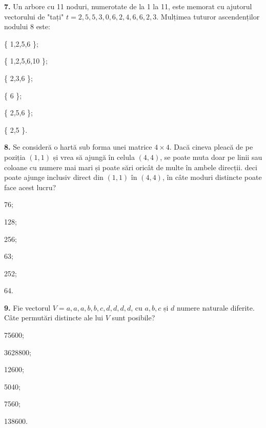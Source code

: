 \documentclass[11pt, a4paper]{article}
\begin{document}
\vspace{0.5cm}

\textbf{7.}\newline
Un arbore cu 11 noduri, numerotate de la 1 la 11, este memorat cu ajutorul vectorului  de "tați" $t={2,5,5,3,0,6,2,4,6,6,2,3}$. Mulțimea tuturor ascendenților nodului 8 este:
\begin{inparaenum}
    \item \{ 1,2,5,6 \};
    \item \{ 1,2,5,6,10 \};
    \item \{ 2,3,6 \};
    \item \{ 6 \};
    \item \{ 2,5,6 \};
    \item \{ 2,5 \}.
\end{inparaenum} 

\vspace{0.5cm}

\textbf{8.}\newline
Se consideră o hartă sub forma unei matrice $4\times4$. Dacă cineva pleacă de pe poziția $(1,1)$ și vrea să ajungă în celula $(4,4)$, se poate muta doar pe linii sau coloane cu numere mai mari și poate sări oricât de multe în ambele direcții. deci poate ajunge inclusiv direct din $(1,1)$ în $(4,4)$, în câte moduri distincte poate face acest lucru?
\begin{inparaenum}
    \item 76;
    \item 128;
    \item 256;
    \item 63;
    \item 252;
    \item 64.
\end{inparaenum}
\vspace{0.5cm}

\textbf{9.}\newline
Fie vectorul $V={a,a,a,b,b,c,d,d,d,d}$, cu $a, b, c$ și $d$ numere naturale diferite. Câte permutări distincte ale lui $V$ sunt posibile?
\begin{inparaenum}
    \item 75600;
    \item 3628800;
    \item 12600;
    \item 5040;
    \item 7560;
    \item 138600.
\end{inparaenum}
\end{document}

